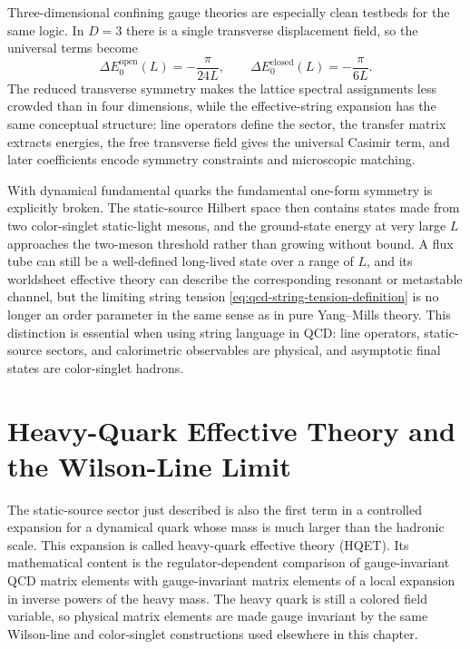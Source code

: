 Three-dimensional confining gauge theories are especially clean testbeds for
the same logic.  In \(D=3\) there is a single transverse displacement field,
so the universal terms become
\[
  \Delta E_0^{\mathrm{open}}(L)=-\frac{\pi}{24L},
  \qquad
  \Delta E_0^{\mathrm{closed}}(L)=-\frac{\pi}{6L}.
\]
The reduced transverse symmetry makes the lattice spectral assignments less
crowded than in four dimensions, while the effective-string expansion has the
same conceptual structure: line operators define the sector, the transfer
matrix extracts energies, the free transverse field gives the universal
Casimir term, and later coefficients encode symmetry constraints and
microscopic matching.

With dynamical fundamental quarks the fundamental one-form symmetry is
explicitly broken.  The static-source Hilbert space then contains states made
from two color-singlet static-light mesons, and the ground-state energy at very
large \(L\) approaches the two-meson threshold rather than growing without
bound.  A flux tube can still be a well-defined long-lived state over a range
of \(L\), and its worldsheet effective theory can describe the corresponding
resonant or metastable channel, but the limiting string tension
\eqref{eq:qcd-string-tension-definition} is no longer an order parameter in the
same sense as in pure Yang--Mills theory.  This distinction is essential when
using string language in QCD: line operators, static-source sectors, and
calorimetric observables are physical, and asymptotic final states are
color-singlet hadrons.

\section{Heavy-Quark Effective Theory and the Wilson-Line Limit}
\label{sec:qcd-hqet-wilson-line-limit}

The static-source sector just described is also the first term in a
controlled expansion for a dynamical quark whose mass is much larger than the
hadronic scale.  This expansion is called heavy-quark effective theory
(HQET).  Its mathematical content is the regulator-dependent comparison of
gauge-invariant QCD matrix elements with gauge-invariant matrix elements of a
local expansion in inverse powers of the heavy mass.  The heavy quark is still
a colored field variable, so physical matrix elements are made gauge invariant
by the same Wilson-line and color-singlet constructions used elsewhere in this
chapter.

